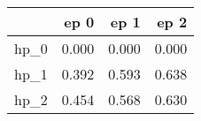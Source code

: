\begin{tabular}{lrrr}
\toprule
{} &   ep 0 &   ep 1 &   ep 2 \\
\midrule
hp\_0 &  0.000 &  0.000 &  0.000 \\
hp\_1 &  0.392 &  0.593 &  0.638 \\
hp\_2 &  0.454 &  0.568 &  0.630 \\
\bottomrule
\end{tabular}
